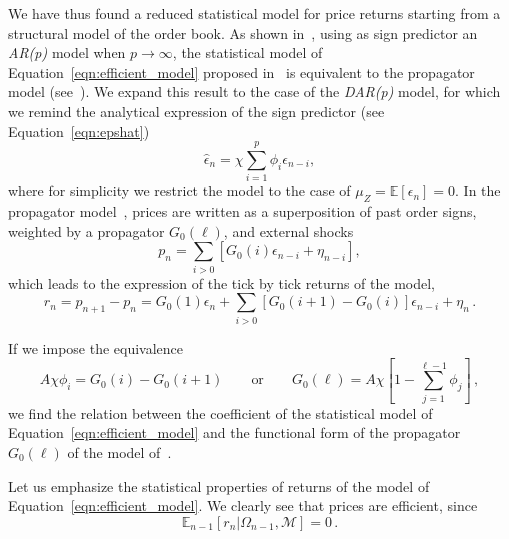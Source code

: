 \documentclass[12pt]{iopart}
\begin{document}
We have thus found a reduced statistical model for price returns starting from a structural model of the order book. As shown in~\cite{bouchaud2009markets}, using as sign predictor an \textit{AR(p)} model when $p\rightarrow\infty$, the statistical model of Equation~\ref{eqn:efficient_model} proposed in~\cite{farmer2006market} is equivalent to the propagator model (see~\cite{bouchaud2004fluctuations,bacry2013hawkes}). We expand this result to the case of the \textit{DAR(p)} model, for which we remind the analytical expression of the sign predictor (see Equation~\ref{eqn:epshat})
\begin{equation*}
\hat{\epsilon}_n=\chi\sum_{i=1}^p \phi_i \epsilon_{n-i},
\end{equation*}
where for simplicity we restrict the model to the case of $\mu_Z=\mathbb{E}[\epsilon_n]=0$. In the propagator model~\cite{bouchaud2004fluctuations}, prices are written as a superposition of past order signs, weighted by a propagator $G_0(\ell)$, and external shocks 
\begin{equation*}
p_n=\sum_{i>0}\left[G_0(i)\epsilon_{n-i}+\eta_{n-i}\right],
\end{equation*}
which leads to the expression of the tick by tick returns of the model,
\begin{equation*}
r_n=p_{n+1}-p_n=G_0(1)\epsilon_n+\sum_{i>0}\left[G_0(i+1)-G_0(i)\right]\epsilon_{n-i}+\eta_n\,.
\end{equation*}

If we impose the equivalence
\begin{equation*}
A \chi \phi_i=G_0(i)-G_0(i+1) \qquad \mbox{or} \qquad G_0(\ell)=A\chi\left[1-\sum_{j=1}^{\ell-1}\phi_j\right]\,,
\end{equation*}
we find the relation between the coefficient of the statistical model of Equation~\ref{eqn:efficient_model} and the functional form of the propagator $G_0(\ell)$ of the model of~\cite{bouchaud2004fluctuations}.

Let us emphasize the statistical properties of returns of the model of Equation~\ref{eqn:efficient_model}. We clearly see that prices are efficient, since
\begin{equation*}
\mathbb{E}_{n-1}[r_n|\Omega_{n-1},\mathcal{M}]=0\,.
\end{equation*}
\end{document}
